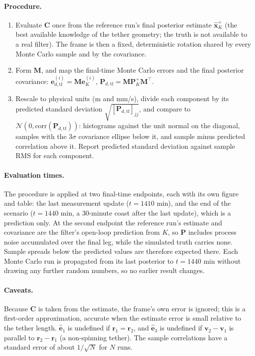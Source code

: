 \documentclass[]{article}
\newcommand{\xh}{\hat{\bm{x}}}
\newcommand{\Pm}{\mathbf{P}}
\begin{document}
\paragraph{Procedure.}
\begin{enumerate}
  \item Evaluate $\mathbf{C}$ once from the reference run's final posterior
        estimate $\xh_K^+$ (the best available knowledge of the tether
        geometry; the truth is not available to a real filter). The frame is
        then a fixed, deterministic rotation shared by every Monte Carlo sample
        and by the covariance.
  \item Form $\mathbf{M}$, and map the final-time Monte Carlo errors and the
        final posterior covariance: $\bm{e}_{d,\mathrm{tf}}^{(i)}=\mathbf{M}\bm{e}_K^{(i)}$,
        $\Pm_{d,\mathrm{tf}}=\mathbf{M}\Pm_K^+\mathbf{M}^\top$.
  \item Rescale to physical units (m and mm/s), divide each component by its
        predicted standard deviation $\sqrt{[\Pm_{d,\mathrm{tf}}]_{jj}}$, and
        compare to $\mathcal{N}(0,\mathrm{corr}(\Pm_{d,\mathrm{tf}}))$:
        histograms against the unit normal on the diagonal, samples with the
        $3\sigma$ covariance ellipse below it, and sample minus predicted
        correlation above it. Report predicted standard deviation against
        sample RMS for each component.
\end{enumerate}

\paragraph{Evaluation times.}
The procedure is applied at two final-time endpoints, each with its own figure
and table: the last measurement update ($t=1410$ min), and the end of the
scenario ($t=1440$ min, a 30-minute coast after the last update), which is a
prediction only. At the second endpoint the reference run's estimate and
covariance are the filter's open-loop prediction from $K$, so $\Pm$ includes
process noise accumulated over the final leg, while the simulated truth carries
none. Sample spreads below the predicted values are therefore expected there.
Each Monte Carlo run is propagated from its last posterior to $t=1440$ min
without drawing any further random numbers, so no earlier result changes.

\paragraph{Caveats.}
Because $\mathbf{C}$ is taken from the estimate, the frame's own error is
ignored; this is a first-order approximation, accurate when the estimate error
is small relative to the tether length. $\hat{\mathbf{e}}_1$ is undefined if
$\mathbf{r}_1=\mathbf{r}_2$, and $\hat{\mathbf{e}}_3$ is undefined if
$\mathbf{v}_2-\mathbf{v}_1$ is parallel to $\mathbf{r}_2-\mathbf{r}_1$ (a
non-spinning tether). The sample correlations have a standard error of about
$1/\sqrt{N}$ for $N$ runs.
\end{document}
